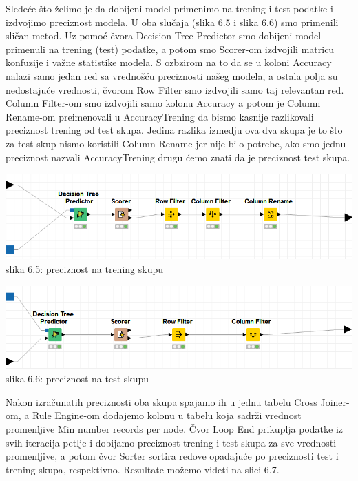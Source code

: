 \documentclass[10pt]{article}
\begin{document}
Slede\' ce \v sto \v zelimo je da dobijeni model primenimo na trening i test podatke i izdvojimo preciznost modela. U oba slu\v caja (slika 6.5 i slika 6.6) smo primenili sli\v can metod. Uz pomo\' c \v cvora Decision Tree Predictor smo dobijeni model primenuli na trening (test) podatke, a potom smo Scorer-om izdvojili matricu konfuzije i va\v zne statistike modela. S ozbzirom na to da se u koloni Accuracy nalazi samo jedan red sa vredno\v s\' cu preciznosti na\v seg modela, a ostala polja su nedostaju\' ce vrednosti, \v cvorom Row Filter smo izdvojili samo taj relevantan red. Column Filter-om smo izdvojili samo kolonu Accuracy a potom je Column Rename-om preimenovali u AccuracyTrening da bismo kasnije razlikovali preciznost trening od test skupa. Jedina razlika izmedju ova dva skupa je to \v sto za test skup nismo koristili Column Rename jer nije bilo potrebe, ako smo jednu preciznost nazvali AccuracyTrening drugu \' cemo znati da je preciznost test skupa.

\begin{center}
\includegraphics[width = \textwidth]{PnaTrening}
slika 6.5: preciznost na trening skupu\\
\end{center}

\begin{center}
\includegraphics[width = \textwidth]{PnaTest}
slika 6.6: preciznost na test skupu\\
\end{center}

Nakon izra\v cunatih preciznosti oba skupa spajamo ih u jednu tabelu Cross Joiner-om, a Rule Engine-om dodajemo kolonu u tabelu koja sadr\v zi vrednost promenljive Min number records per node. \v Cvor Loop End prikuplja podatke iz svih iteracija petlje i dobijamo preciznost trening i test skupa za sve vrednosti promenljive, a potom \v cvor Sorter sortira redove opadaju\' ce po preciznosti test i trening skupa, respektivno. Rezultate mo\v zemo videti na slici 6.7.
\end{document}
